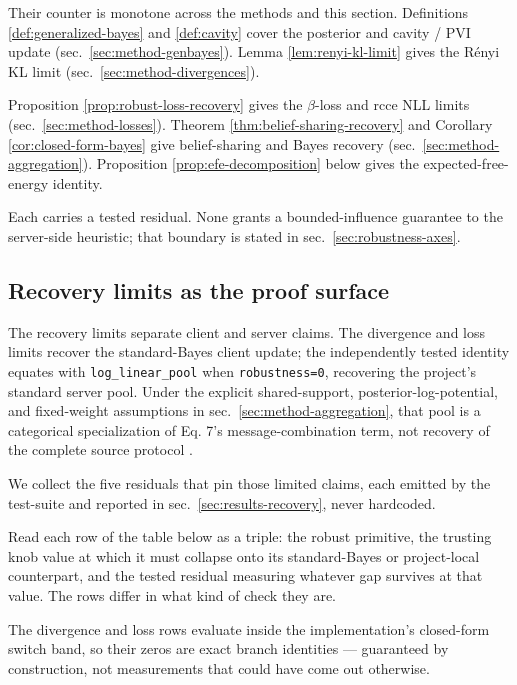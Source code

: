 \documentclass[
  english,
]{article}
\theoremstyle{plain}
\theoremstyle{definition}
\theoremstyle{remark}
\theoremstyle{definition}
\begin{document}
Their counter is monotone across the methods and this section.
Definitions \ref{def:generalized-bayes} and \ref{def:cavity} cover the
posterior and cavity / PVI update (sec.~\ref{sec:method-genbayes}).
Lemma \ref{lem:renyi-kl-limit} gives the Rényi KL limit
(sec.~\ref{sec:method-divergences}).

Proposition \ref{prop:robust-loss-recovery} gives the \(\beta\)-loss and
rcce NLL limits (sec.~\ref{sec:method-losses}). Theorem
\ref{thm:belief-sharing-recovery} and Corollary
\ref{cor:closed-form-bayes} give belief-sharing and Bayes recovery
(sec.~\ref{sec:method-aggregation}). Proposition
\ref{prop:efe-decomposition} below gives the expected-free-energy
identity.

Each carries a tested residual. None grants a bounded-influence
guarantee to the server-side  heuristic; that
boundary is stated in sec.~\ref{sec:robustness-axes}.

\subsection{Recovery limits as the proof
surface}\label{sec:formalism-recovery}

The recovery limits separate client and server claims. The divergence
and loss limits recover the standard-Bayes client update; the
independently tested identity equates  with
\texttt{log\_linear\_pool} when \texttt{robustness=0}, recovering the
project's standard server pool. Under the explicit shared-support,
posterior-log-potential, and fixed-weight assumptions in
sec.~\ref{sec:method-aggregation}, that pool is a categorical
specialization of Eq. 7's message-combination term, not recovery of the
complete source protocol \citep{friston2024federated}.

We collect the five residuals that pin those limited claims, each
emitted by the test-suite and reported in
sec.~\ref{sec:results-recovery}, never hardcoded.

Read each row of the table below as a triple: the robust primitive, the
trusting knob value at which it must collapse onto its standard-Bayes or
project-local counterpart, and the tested residual measuring whatever
gap survives at that value. The rows differ in what kind of check they
are.

The divergence and loss rows evaluate inside the implementation's
closed-form switch band, so their zeros are exact branch identities ---
guaranteed by construction, not measurements that could have come out
otherwise.
\end{document}
